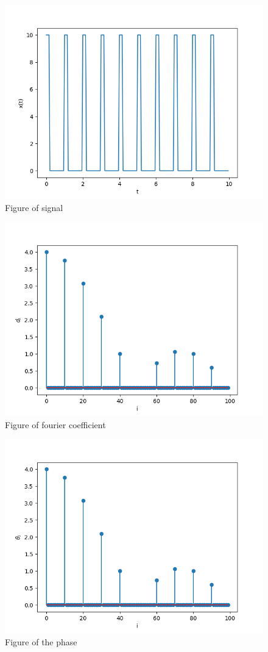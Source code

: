 \documentclass[12pt]{article}
\begin{document}
\begin{figure}[h!]
    \centering
    \includegraphics[width=0.8\linewidth]{../pb4_x}
    \caption{Figure of signal}
\end{figure}
\begin{figure}[h!]
    \centering
    \includegraphics[width=0.8\linewidth]{../pb4_d}
    \caption{Figure of fourier coefficient}
\end{figure}
\begin{figure}[h!]
    \centering
    \includegraphics[width=0.8\linewidth]{../pb4_p}
    \caption{Figure of the phase}
\end{figure}
\end{document}
